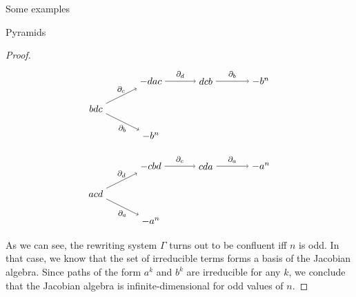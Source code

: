 \begin{chapter}{Some examples}
\begin{section}{Pyramids}
\begin{proof}
\[\begin{tikzpicture}
\node (1) at (0,0) {$bdc$};
\node (a2) at (2,1) {$-dac$};
\node (b2) at (2,-1) {$-b^n$};
\node (a3) at (4,1) {$dcb$};
\node (a4) at (6,1) {$-b^n$};
\draw[->] (1) to node[above, font=\footnotesize]{$\partial_c$} (a2);
\draw[->] (1) to node[below, font=\footnotesize]{$\partial_b$} (b2);
\draw[->] (a2) to node[above, font=\footnotesize]{$\partial_d$} (a3);
\draw[->] (a3) to node[above, font=\footnotesize]{$\partial_b$} (a4);
\end{tikzpicture}
\]
\[
\begin{tikzpicture}
\node (1) at (0,0) {$acd$};
\node (a2) at (2,1) {$-cbd$};
\node (b2) at (2,-1) {$-a^n$};
\node (a3) at (4,1) {$cda$};
\node (a4) at (6,1) {$-a^n$};
\draw[->] (1) to node[above, font=\footnotesize]{$\partial_d$} (a2);
\draw[->] (1) to node[below, font=\footnotesize]{$\partial_a$} (b2);
\draw[->] (a2) to node[above, font=\footnotesize]{$\partial_c$} (a3);
\draw[->] (a3) to node[above, font=\footnotesize]{$\partial_a$} (a4);
\end{tikzpicture}
\]
As we can see, the rewriting system $\Gamma$ turns out to be confluent iff $n$ is odd. In that case, we know that the set of irreducible terms forms a basis of the Jacobian algebra. Since paths of the form $a^k$ and $b^k$ are irreducible for any $k$, we conclude that the Jacobian algebra is infinite-dimensional for odd values of $n$.


\end{proof}
\end{section}
\end{chapter}
